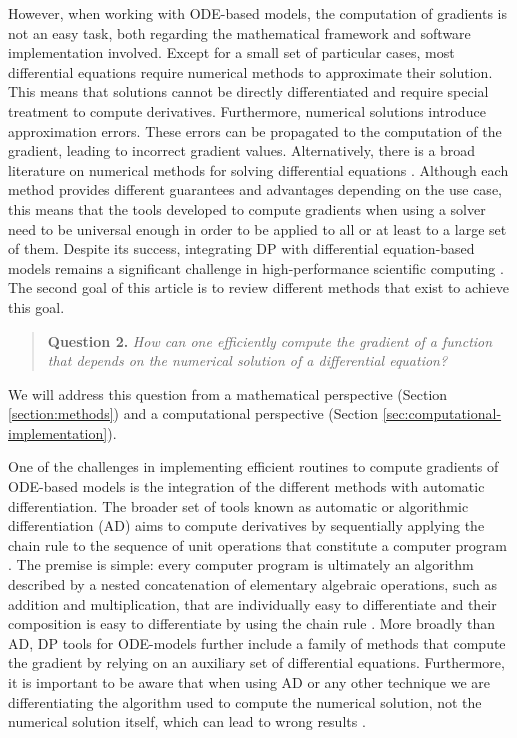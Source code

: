 However, when working with ODE-based models, the computation of gradients is not an easy task, both regarding the mathematical framework and software implementation involved. 
Except for a small set of particular cases, most differential equations require numerical methods to approximate their solution.
This means that solutions cannot be directly differentiated and require special treatment to compute derivatives. 
Furthermore, numerical solutions introduce approximation errors. 
These errors can be propagated to the computation of the gradient, leading to incorrect gradient values. 
Alternatively, there is a broad literature on numerical methods for solving differential equations \cite{hairer-solving-1, hairer-solving-2}. 
Although each method provides different guarantees and advantages depending on the use case, this means that the tools developed to compute gradients when using a solver need to be universal enough in order to be applied to all or at least to a large set of them. 
Despite its success, integrating DP with differential equation-based models remains a significant challenge in high-performance scientific computing \cite{Naumann.2011}.
The second goal of this article is to review different methods that exist to achieve this goal.
\begin{quote}
    \textbf{Question 2. }
    \textit{How can one efficiently compute the gradient of a function that depends on the numerical solution of a differential equation?}
\end{quote}
We will address this question from a mathematical perspective (Section \ref{section:methods}) and a computational perspective (Section \ref{sec:computational-implementation}). 

One of the challenges in implementing efficient routines to compute gradients of ODE-based models is the integration of the different methods with automatic differentiation.
The broader set of tools known as automatic or algorithmic differentiation (AD) aims to compute derivatives by sequentially applying the chain rule to the sequence of unit operations that constitute a computer program \cite{Griewank:2008kh, Naumann.2011}. 
The premise is simple: every computer program is ultimately an algorithm described by a nested concatenation of elementary algebraic operations, such as addition and multiplication, that are individually easy to differentiate and their composition is easy to differentiate by using the chain rule \cite{Giering:1998in}. 
More broadly than AD, DP tools for ODE-models further include a family of methods that compute the gradient by relying on an auxiliary set of differential equations. 
Furthermore, it is important to be aware that when using AD or any other technique we are differentiating the algorithm used to compute the numerical solution, not the numerical solution itself, which can lead to wrong results \cite{Eberhard_Bischof_1996}.


